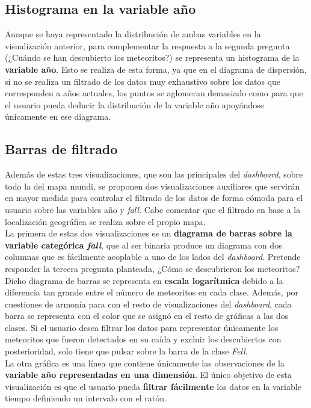 \documentclass[12pt]{article}
\begin{document}
	\subsection{Histograma en la variable año}
	Aunque se haya representado la distribución de ambas variables en la visualización anterior, para complementar la respuesta a la segunda pregunta (¿Cuándo se han descubierto los meteoritos?) se representa un histograma de la \textbf{variable año}. Esto se realiza de esta forma, ya que en el diagrama de dispersión, si no se realiza un filtrado de los datos muy exhaustivo sobre los datos que corresponden a años actuales, los puntos se aglomeran demasiado como para que el usuario pueda deducir la distribución de la variable año apoyándose únicamente en ese diagrama. 
	\subsection{Barras de filtrado}
	Además de estas tres visualizaciones, que son las principales del \textit{dashboard}, sobre todo la del mapa mundi, se proponen dos visualizaciones auxiliares que servirán en mayor medida para controlar el filtrado de los datos de forma cómoda para el usuario sobre las variables año y \textit{fall}. Cabe comentar que el filtrado en base a la localización geográfica se realiza sobre el propio mapa.\\
	La primera de estas dos visualizaciones es un \textbf{diagrama de barras sobre la variable categórica \textit{fall}}, que al ser binaria produce un diagrama con dos columnas que es fácilmente acoplable a uno de los lados del \textit{dashboard}. Pretende responder la tercera pregunta planteada, ¿Cómo se descubrieron los meteoritos? Dicho diagrama de barras se representa en \textbf{escala logarítmica} debido a la diferencia tan grande entre el número de meteoritos en cada clase. Además, por cuestiones de armonía para con el resto de visualizaciones del \textit{dashboard}, cada barra se representa con el color que se asignó en el resto de gráficas a las dos clases. Si el usuario desea filtrar los datos para representar únicamente los meteoritos que fueron detectados en su caída y excluir los descubiertos con posterioridad, solo tiene que pulsar sobre la barra de la clase \textit{Fell}.\\
	La otra gráfica es una línea que contiene únicamente las observaciones de la \textbf{variable año representadas en una dimensión}. El único objetivo de esta visualización es que el usuario pueda \textbf{filtrar fácilmente} los datos en la variable tiempo definiendo un intervalo con el ratón. 
\end{document}
